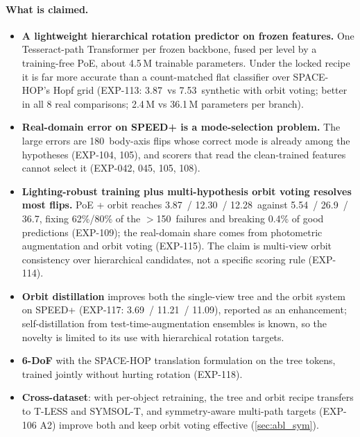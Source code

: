 \paragraph{What is claimed.}
\begin{itemize}
\item \textbf{A lightweight hierarchical rotation predictor on frozen features.} One Tesseract-path Transformer per frozen backbone, fused per level by a training-free PoE, about 4.5\,M trainable parameters. Under the locked recipe it is far more accurate than a count-matched flat classifier over SPACE-HOP's Hopf grid (EXP-113: 3.87\appDdeg\ vs 7.53\appDdeg\ synthetic with orbit voting; better in all 8 real comparisons; 2.4\,M vs 36.1\,M parameters per branch).
\item \textbf{Real-domain error on SPEED+ is a mode-selection problem.} The large errors are 180\appDdeg\ body-axis flips whose correct mode is already among the hypotheses (EXP-104, 105), and scorers that read the clean-trained features cannot select it (EXP-042, 045, 105, 108).
\item \textbf{Lighting-robust training plus multi-hypothesis orbit voting resolves most flips.} PoE + orbit reaches 3.87\appDdeg\ / 12.30\appDdeg\ / 12.28\appDdeg\ against 5.54\appDdeg\ / 26.9\appDdeg\ / 36.7\appDdeg, fixing 62\%/80\% of the $>$150\appDdeg\ failures and breaking 0.4\% of good predictions (EXP-109); the real-domain share comes from photometric augmentation and orbit voting (EXP-115). The claim is multi-view orbit consistency over hierarchical candidates, not a specific scoring rule (EXP-114).
\item \textbf{Orbit distillation} improves both the single-view tree and the orbit system on SPEED+ (EXP-117: 3.69\appDdeg\ / 11.21\appDdeg\ / 11.09\appDdeg), reported as an enhancement; self-distillation from test-time-augmentation ensembles is known, so the novelty is limited to its use with hierarchical rotation targets.
\item \textbf{6-DoF} with the SPACE-HOP translation formulation on the tree tokens, trained jointly without hurting rotation (EXP-118).
\item \textbf{Cross-dataset}: with per-object retraining, the tree and orbit recipe transfers to T-LESS and SYMSOL-T, and symmetry-aware multi-path targets (EXP-106 A2) improve both and keep orbit voting effective (\cref{sec:abl_sym}).
\end{itemize}

